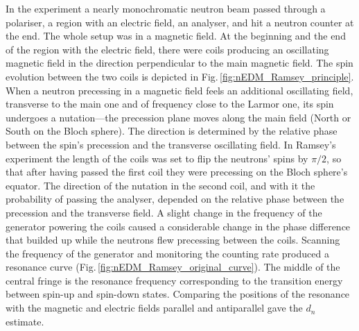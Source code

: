 In the experiment a nearly monochromatic neutron beam passed through a polariser, a region with an electric field, an analyser, and hit a neutron counter at the end. The whole setup was in a magnetic field. At the beginning and the end of the region with the electric field, there were coils producing an oscillating magnetic field in the direction perpendicular to the main magnetic field. The spin evolution between the two coils is depicted in Fig.\,\ref{fig:nEDM_Ramsey_principle}. When a neutron precessing in a magnetic field feels an additional oscillating field, transverse to the main one and of frequency close to the Larmor one, its spin undergoes a nutation---the precession plane moves along the main field (North or South on the Bloch sphere). The direction is determined by the relative phase between the spin's precession and the transverse oscillating field. In Ramsey's experiment the length of the coils was set to flip the neutrons' spins by $\pi/2$, so that after having passed the first coil they were precessing on the Bloch sphere's equator. The direction of the nutation in the second coil, and with it the probability of passing the analyser, depended on the relative phase between the precession and the transverse field. A slight change in the frequency of the generator powering the coils caused a considerable change in the phase difference that builded up while the neutrons flew precessing between the coils. Scanning the frequency of the generator and monitoring the counting rate produced a resonance curve (Fig.\,\ref{fig:nEDM_Ramsey_original_curve}). The middle of the central fringe is the resonance frequency corresponding to the transition energy between spin-up and spin-down states.
Comparing the positions of the resonance with the magnetic and electric fields parallel and antiparallel gave the $d_n$ estimate.

